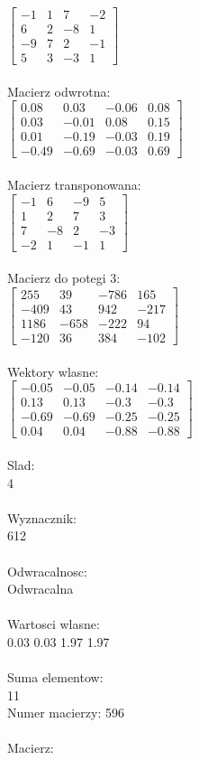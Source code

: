 \documentclass[a4paper,12pt]{article}
\begin{document}
$\begin{bmatrix} -1&1&7&-2\\6&2&-8&1\\-9&7&2&-1\\5&3&-3&1 \end{bmatrix}$
\\
\\
Macierz odwrotna:\\

$\begin{bmatrix} 0.08&0.03&-0.06&0.08\\0.03&-0.01&0.08&0.15\\0.01&-0.19&-0.03&0.19\\-0.49&-0.69&-0.03&0.69 \end{bmatrix}$
\\
\\
Macierz transponowana:\\

$\begin{bmatrix} -1&6&-9&5\\1&2&7&3\\7&-8&2&-3\\-2&1&-1&1 \end{bmatrix}$
\\
\\
Macierz do potegi 3:\\

$\begin{bmatrix} 255&39&-786&165\\-409&43&942&-217\\1186&-658&-222&94\\-120&36&384&-102 \end{bmatrix}$
\\
\\
Wektory wlasne:\\

$\begin{bmatrix} -0.05&-0.05&-0.14&-0.14\\0.13&0.13&-0.3&-0.3\\-0.69&-0.69&-0.25&-0.25\\0.04&0.04&-0.88&-0.88 \end{bmatrix}$
\\
\\
Slad:\\
4
\\
\\
Wyznacznik:\\
612
\\
\\
Odwracalnosc:\\
Odwracalna
\\
\\
Wartosci wlasne:\\
0.03 0.03 1.97 1.97
\\
\\
Suma elementow:\\
11
\\
\newpage
Numer macierzy:
596
\\
\\
Macierz:\\
\end{document}
